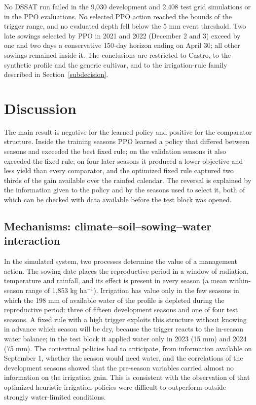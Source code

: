 \documentclass[times,final,authoryear]{elsarticle}
\begin{document}
No DSSAT run failed in the 9,030 development and 2,408 test grid simulations or in the PPO evaluations. No selected PPO action reached the bounds of the trigger range, and no evaluated depth fell below the 5 mm event threshold. Two late sowings selected by PPO in 2021 and 2022 (December 2 and 3) exceed by one and two days a conservative 150-day horizon ending on April 30; all other sowings remained inside it. The conclusions are restricted to Castro, to the synthetic profile and the generic cultivar, and to the irrigation-rule family described in Section~\ref{subdecision}.

\section{Discussion}
\label{discussao}

The main result is negative for the learned policy and positive for the comparator structure. Inside the training seasons PPO learned a policy that differed between seasons and exceeded the best fixed rule; on the validation seasons it also exceeded the fixed rule; on four later seasons it produced a lower objective and less yield than every comparator, and the optimized fixed rule captured two thirds of the gain available over the rainfed calendar. The reversal is explained by the information given to the policy and by the seasons used to select it, both of which can be checked with data available before the test block was opened.

\subsection{Mechanisms: climate--soil--sowing--water interaction}
\label{subdisc_mechanisms}

In the simulated system, two processes determine the value of a management action. The sowing date places the reproductive period in a window of radiation, temperature and rainfall, and its effect is present in every season (a mean within-season range of 1,853 kg ha$^{-1}$). Irrigation has value only in the few seasons in which the 198 mm of available water of the profile is depleted during the reproductive period: three of fifteen development seasons and one of four test seasons. A fixed rule with a high trigger exploits this structure without knowing in advance which season will be dry, because the trigger reacts to the in-season water balance; in the test block it applied water only in 2023 (15 mm) and 2024 (75 mm). The contextual policies had to anticipate, from information available on September 1, whether the season would need water, and the correlations of the development seasons showed that the pre-season variables carried almost no information on the irrigation gain. This is consistent with the observation of \citet{kelly2024assessing} that optimized heuristic irrigation policies were difficult to outperform outside strongly water-limited conditions.
\end{document}
